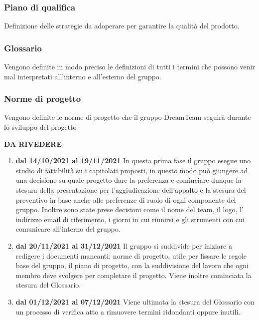 \subsubsection{Piano di qualifica}
Definizione delle strategie da adoperare per garantire la qualità del prodotto.
\subsubsection{Glossario}
Vengono definite in modo preciso le definizioni di tutti i termini che possono venir mal interpretati all'interno e all’esterno del gruppo.
\subsubsection{Norme di progetto}
Vengono definite le norme di progetto che il gruppo DreamTeam seguirà durante lo sviluppo del progetto

\textbf{DA RIVEDERE}
\begin{enumerate}
\item \textbf{dal 14/10/2021 al 19/11/2021} In questa prima fase il gruppo esegue uno studio di fattibilità su i capitolati proposti,  in questo modo può giungere ad una decisione su quale progetto dare la preferenza e cominciare dunque la stesura della presentazione per l’aggiudicazione dell’appalto e la stesura del preventivo in base anche alle preferenze di ruolo di ogni componente del gruppo. Inoltre sono state prese decisioni come il nome del team, il logo, l’ indirizzo email di riferimento, i giorni in cui riunirsi e gli strumenti con cui comunicare all’interno del gruppo.

\item \textbf{dal 20/11/2021 al 31/12/2021} Il gruppo si suddivide per iniziare a redigere i documenti mancanti: norme di progetto, utile per fissare le regole base del gruppo,  il piano di progetto,  con la suddivisione del lavoro che ogni membro deve svolgere per completare il progetto. Viene inoltre cominciata la stesura del Glossario.

\item \textbf{dal 01/12/2021 al 07/12/2021} Viene ultimata la stesura del Glossario con un processo di verifica atto a rimuovere termini ridondanti oppure inutili.

\end{enumerate}
